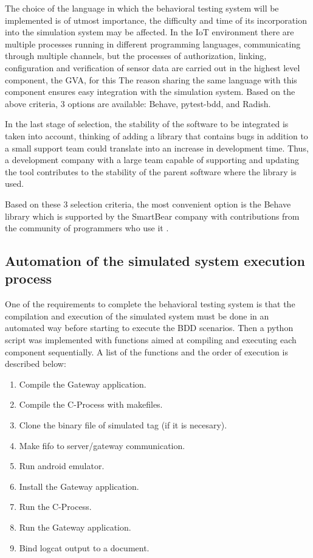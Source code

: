 \documentclass[journal]{IEEEtran}	%
\begin{document}
The choice of the language in which the behavioral testing system will be implemented is of utmost importance, the difficulty and time of its incorporation into the simulation system may be affected. In the IoT environment there are multiple processes running in different programming languages, communicating through multiple channels, but the processes of authorization, linking, configuration and verification of sensor data are carried out in the highest level component, the GVA, for this The reason sharing the same language with this component ensures easy integration with the simulation system. Based on the above criteria, 3 options are available: Behave, pytest-bdd, and Radish.

In the last stage of selection, the stability of the software to be integrated is taken into account, thinking of adding a library that contains bugs in addition to a small support team could translate into an increase in development time. Thus, a development company with a large team capable of supporting and updating the tool contributes to the stability of the parent software where the library is used.

Based on these 3 selection criteria, the most convenient option is the Behave library which is supported by the SmartBear company with contributions from the community of programmers who use it \cite{behave2021github}.

\subsection{Automation of the simulated system execution process}

One of the requirements to complete the behavioral testing system is that the compilation and execution of the simulated system must be done in an automated way before starting to execute the BDD scenarios. Then a python script was implemented with functions aimed at compiling and executing each component sequentially. A list of the functions and the order of execution is described below:

\begin{enumerate}
    \item Compile the Gateway application.
    \item Compile the C-Process with makefiles.
    \item Clone the binary file of simulated tag (if it is necesary).
    \item Make fifo to server/gateway communication.
    \item Run android emulator.
    \item Install the Gateway application.
    \item Run the C-Process.
    \item Run the Gateway application.
    \item Bind logcat output to a document.
\end{enumerate}
\end{document}
